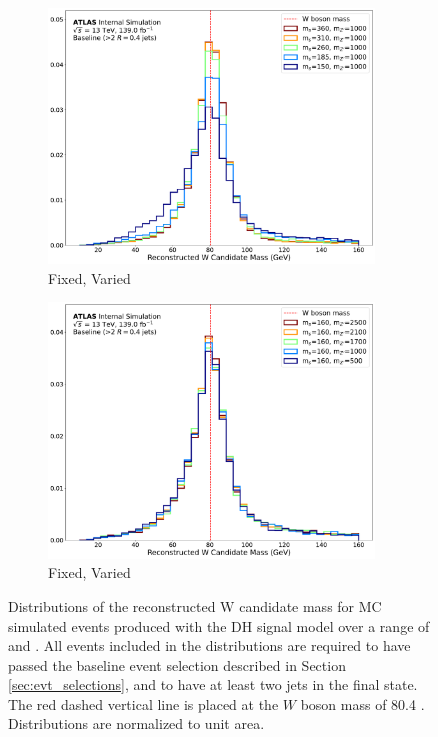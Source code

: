 \begin{figure}[h]
	\centering
	\begin{subfigure}[b]{0.49\textwidth}
	\includegraphics[width=0.95\textwidth]{Figures/5/WCand_m_ms.pdf}
	\caption{\mZp Fixed, \ms Varied}
	\label{fig:resolved_Wmass_reco_ms}
	\end{subfigure}
	\begin{subfigure}[b]{0.49\textwidth}
	\includegraphics[width=0.95\textwidth]{Figures/5/WCand_m_mZp.pdf}
	\caption{\ms Fixed, \mZp Varied}
	\label{fig:resolved_Wmass_reco_mZp}
	\end{subfigure}
	\caption[]{Distributions of the reconstructed W candidate mass for MC simulated events produced with the DH signal model over a range of \ms and \mZp. All events included in the distributions are required to have passed the baseline event selection described in Section \ref{sec:evt_selections}, and to have at least two \smallR jets in the final state. The red dashed vertical line is placed at the \(W\) boson mass of 80.4 \GeV. Distributions are normalized to unit area.}
	\label{fig:resolved_Wmass_reco}
\end{figure}

